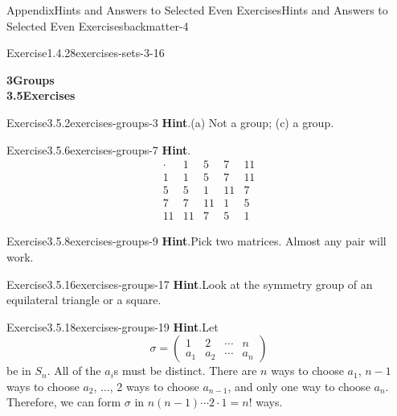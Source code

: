 \documentclass[oneside,10pt,]{book}
\newcommand{\blocktitlefont}{\relax}
\numberwithin{equation}{section}
\begin{document}
\begin{solutions-chapter}{Appendix}{Hints and Answers to Selected Even Exercises}{}{Hints and Answers to Selected Even Exercises}{}{}{backmatter-4}
\begin{divisionsolution}{Exercise}{1.4.28}{}{exercises-sets-3-16}
\end{divisionsolution}%
\par\medskip\noindent
\par\medskip
\noindent\textbf{\Large{}3\space\textperiodcentered\space{}Groups\\
3.5\space\textperiodcentered\space{}Exercises}
\begin{divisionsolution}{Exercise}{3.5.2}{}{exercises-groups-3}%
\noindent\textbf{\blocktitlefont Hint}.\hypertarget{exercises-groups-3-2-back}{}\quad{}(a) Not a group; (c) a group.%
\end{divisionsolution}%
\begin{divisionsolution}{Exercise}{3.5.6}{}{exercises-groups-7}%
\noindent\textbf{\blocktitlefont Hint}.\hypertarget{exercises-groups-7-2-back}{}\quad{}%
\begin{equation*}
\begin{array}{c|cccc}
\cdot & 1  & 5  & 7  & 11 \\
\hline
1 & 1 & 5 & 7 & 11 \\ 5 & 5 & 1 & 11 & 7 \\
7 & 7 & 11 & 1 & 5 \\ 11 & 11 & 7 & 5 & 1
\end{array}
\end{equation*}
%
\end{divisionsolution}%
\begin{divisionsolution}{Exercise}{3.5.8}{}{exercises-groups-9}%
\noindent\textbf{\blocktitlefont Hint}.\hypertarget{exercises-groups-9-2-back}{}\quad{}Pick two matrices. Almost any pair will work.%
\end{divisionsolution}%
\begin{divisionsolution}{Exercise}{3.5.16}{}{exercises-groups-17}%
\noindent\textbf{\blocktitlefont Hint}.\hypertarget{exercises-groups-17-2-back}{}\quad{}Look at the symmetry group of an equilateral triangle or a square.%
\end{divisionsolution}%
\begin{divisionsolution}{Exercise}{3.5.18}{}{exercises-groups-19}%
\noindent\textbf{\blocktitlefont Hint}.\hypertarget{exercises-groups-19-2-back}{}\quad{}Let%
\begin{equation*}
\sigma =
\begin{pmatrix}
1 & 2 & \cdots & n \\ a_1 & a_2 & \cdots & a_n
\end{pmatrix}
\end{equation*}
be in \(S_n\). All of the \(a_i\)s must be distinct. There are \(n\) ways to choose \(a_1\), \(n-1\) ways to choose \(a_2\), \(\ldots\), 2 ways to choose \(a_{n - 1}\), and only one way to choose \(a_n\). Therefore, we can form \(\sigma\) in \(n(n - 1) \cdots 2 \cdot 1 = n!\) ways.%

\end{divisionsolution}
\end{solutions-chapter}
\end{document}
